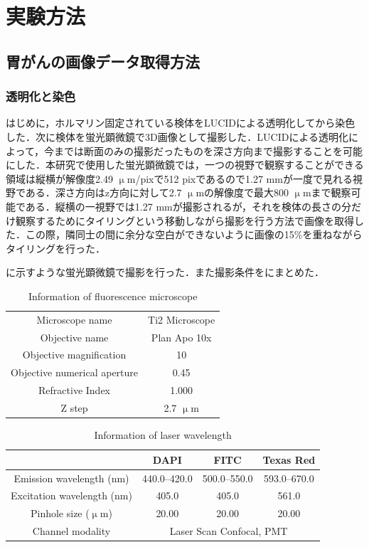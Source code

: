 \chapter{実験方法}

\section{胃がんの画像データ取得方法}

\subsection{透明化と染色}
はじめに，ホルマリン固定されている検体をLUCIDによる透明化してから染色した．次に検体を蛍光顕微鏡で3D画像として撮影した．LUCIDによる透明化によって，今までは断面のみの撮影だったものを深さ方向まで撮影することを可能にした．本研究で使用した蛍光顕微鏡では，一つの視野で観察することができる領域は縦横が解像度2.49 $\upmu$m/pixで512 pixであるので1.27 mmが一度で見れる視野である．深さ方向はz方向に対して2.7 $\upmu$mの解像度で最大800 $\upmu$mまで観察可能である．縦横の一視野では1.27 mmが撮影されるが，それを検体の長さの分だけ観察するためにタイリングという移動しながら撮影を行う方法で画像を取得した．この際，隣同士の間に余分な空白ができないように画像の15\%を重ねながらタイリングを行った．

に示すような蛍光顕微鏡で撮影を行った．また撮影条件をにまとめた．

\begin{table}[H]
	\centering
	\caption{Information of fluorescence microscope}
	\label{tab:蛍光顕微鏡}
	\begin{tabular}{cc}\toprule
		Microscope name & Ti2 Microscope \\ 
		Objective name & Plan Apo 10x \\ 
		Objective magnification & 10 \\ 
		Objective numerical aperture & 0.45 \\ 
		Refractive Index & 1.000 \\
		Z step & 2.7 $\upmu$m \\ \bottomrule
	\end{tabular} 
\end{table}

\begin{table}[H]
	\centering
	\caption{Information of laser wavelength}
	\label{tab:レーザー波長}
	\begin{tabular}{cccc}\toprule
		& DAPI & FITC & Texas Red \\ \midrule
		Emission wavelength (nm) & 440.0--420.0 & 500.0--550.0 & 593.0--670.0 \\ 
		Excitation wavelength (nm) & 405.0 & 405.0 & 561.0 \\ 
		Pinhole size ($\upmu$m) & 20.00 & 20.00 & 20.00 \\ 
		Channel modality & \multicolumn{3}{c}{Laser Scan Confocal, PMT } \\ \bottomrule
	\end{tabular}
\end{table}


